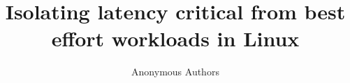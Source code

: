 \documentclass[sigconf,anonymous,natbib=false,10pt]{acmart}
\begin{document}

\date{}

\title{Isolating latency critical from best effort workloads in Linux}


\author{
{\rm Anonymous Authors}\\
} %


\maketitle





% 





%
\printbibliography

\end{document}
